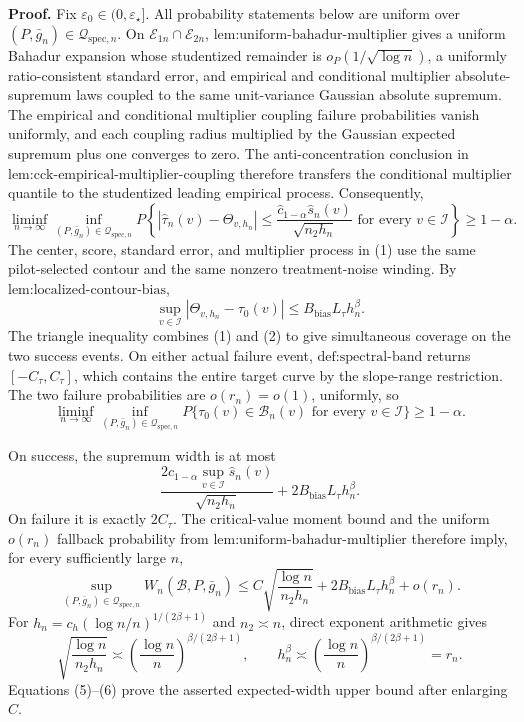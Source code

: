 \textbf{Proof.}
Fix \(\varepsilon_0\in(0,\varepsilon_\star]\). All probability statements below are uniform over \((P,\bar g_n)\in\mathcal Q_{\mathrm{spec},n}\). On \(\mathcal E_{1n}\cap\mathcal E_{2n}\), \(\text{lem:uniform-bahadur-multiplier}\) gives a uniform Bahadur expansion whose studentized remainder is \(o_P(1/\sqrt{\log n})\), a uniformly ratio-consistent standard error, and empirical and conditional multiplier absolute-supremum laws coupled to the same unit-variance Gaussian absolute supremum. The empirical and conditional multiplier coupling failure probabilities vanish uniformly, and each coupling radius multiplied by the Gaussian expected supremum plus one converges to zero. The anti-concentration conclusion in \(\text{lem:cck-empirical-multiplier-coupling}\) therefore transfers the conditional multiplier quantile to the studentized leading empirical process. Consequently,
\[
 \liminf_{n\to\infty}\inf_{(P,\bar g_n)\in\mathcal Q_{\mathrm{spec},n}}
 P\left\{
 |\widehat\tau_n(v)-\Theta_{v,h_n}|
 \le\frac{\widehat c_{1-\alpha}\widehat s_n(v)}{\sqrt{n_2h_n}}
 \text{ for every }v\in\mathcal I
 \right\}\ge1-\alpha. \tag{1}
\]
The center, score, standard error, and multiplier process in (1) use the same pilot-selected contour and the same nonzero treatment-noise winding. By \(\text{lem:localized-contour-bias}\),
\[
 \sup_{v\in\mathcal I}|\Theta_{v,h_n}-\tau_0(v)|
 \le B_{\mathrm{bias}}L_\tau h_n^\beta. \tag{2}
\]
The triangle inequality combines (1) and (2) to give simultaneous coverage on the two success events. On either actual failure event, \(\text{def:spectral-band}\) returns \([-C_\tau,C_\tau]\), which contains the entire target curve by the slope-range restriction. The two failure probabilities are \(o(r_n)=o(1)\), uniformly, so
\[
 \liminf_{n\to\infty}\inf_{(P,\bar g_n)\in\mathcal Q_{\mathrm{spec},n}}
 P\{\tau_0(v)\in\mathcal B_n(v)\text{ for every }v\in\mathcal I\}
 \ge1-\alpha. \tag{3}
\]

On success, the supremum width is at most
\[
 \frac{2\widehat c_{1-\alpha}\sup_{v\in\mathcal I}\widehat s_n(v)}
 {\sqrt{n_2h_n}}
 +2B_{\mathrm{bias}}L_\tau h_n^\beta. \tag{4}
\]
On failure it is exactly \(2C_\tau\). The critical-value moment bound and the uniform \(o(r_n)\) fallback probability from \(\text{lem:uniform-bahadur-multiplier}\) therefore imply, for every sufficiently large \(n\),
\[
 \sup_{(P,\bar g_n)\in\mathcal Q_{\mathrm{spec},n}}
 W_n(\mathcal B,P,\bar g_n)
 \le C\sqrt{\frac{\log n}{n_2h_n}}
 +2B_{\mathrm{bias}}L_\tau h_n^\beta+o(r_n). \tag{5}
\]
For \(h_n=c_h(\log n/n)^{1/(2\beta+1)}\) and \(n_2\asymp n\), direct exponent arithmetic gives
\[
 \sqrt{\frac{\log n}{n_2h_n}}
 \asymp
 \left(\frac{\log n}{n}\right)^{\beta/(2\beta+1)},
 \qquad
 h_n^\beta
 \asymp
 \left(\frac{\log n}{n}\right)^{\beta/(2\beta+1)}
 =r_n. \tag{6}
\]
Equations (5)--(6) prove the asserted expected-width upper bound after enlarging \(C\).

